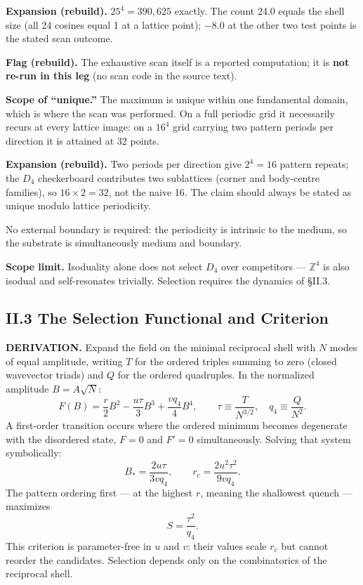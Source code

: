 \documentclass[11pt,a4paper]{article}
\newcommand{\expansion}[1]{\par\smallskip\noindent\textbf{Expansion (rebuild).} #1\par\smallskip}
\newcommand{\flagbox}[1]{\par\smallskip\noindent\textbf{Flag (rebuild).} #1\par\smallskip}
\begin{document}
\expansion{$25^4 = 390{,}625$ exactly. The count 24.0 equals the shell size (all 24 cosines equal 1 at a lattice point); $-8.0$ at the other two test points is the stated scan outcome.}
\flagbox{The exhaustive scan itself is a reported computation; it is \textbf{not re-run in this leg} (no scan code in the source text).}

\textbf{Scope of ``unique.''} The maximum is unique within one fundamental domain, which is where the scan was performed. On a full periodic grid it necessarily recurs at every lattice image: on a $16^4$ grid carrying two pattern periods per direction it is attained at 32 points.
\expansion{Two periods per direction give $2^4 = 16$ pattern repeats; the $D_4$ checkerboard contributes two sublattices (corner and body-centre families), so $16 \times 2 = 32$, not the naive 16. The claim should always be stated as unique modulo lattice periodicity.}
No external boundary is required: the periodicity is intrinsic to the medium, so the substrate is simultaneously medium and boundary.

\textbf{Scope limit.} Isoduality alone does not select $D_4$ over competitors --- $\mathbb{Z}^4$ is also isodual and self-resonates trivially. Selection requires the dynamics of \S II.3.

\subsection{II.3 The Selection Functional and Criterion}
\textbf{DERIVATION.} Expand the field on the minimal reciprocal shell with $N$ modes of equal amplitude, writing $T$ for the ordered triples summing to zero (closed wavevector triads) and $Q$ for the ordered quadruples. In the normalized amplitude $B = A\sqrt{N}$:
\begin{equation}
F(B) = \frac{r}{2}B^2 - \frac{u\tau}{3}B^3 + \frac{vq_4}{4}B^4,
\qquad
\tau \equiv \frac{T}{N^{3/2}}, \quad q_4 \equiv \frac{Q}{N^2}.
\end{equation}
A first-order transition occurs where the ordered minimum becomes degenerate with the disordered state, $F = 0$ and $F' = 0$ simultaneously. Solving that system symbolically:
\begin{equation}
B_* = \frac{2u\tau}{3vq_4}, \qquad r_c = \frac{2u^2\tau^2}{9vq_4}.
\end{equation}
The pattern ordering first --- at the highest $r$, meaning the shallowest quench --- maximizes
\begin{equation}
S = \frac{\tau^2}{q_4}.
\end{equation}
This criterion is parameter-free in $u$ and $v$: their values scale $r_c$ but cannot reorder the candidates. Selection depends only on the combinatorics of the reciprocal shell.
\end{document}
